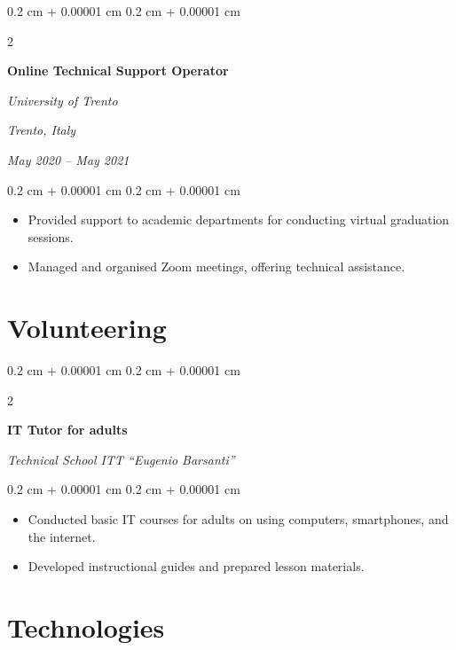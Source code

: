 \documentclass[10pt, a4paper]{article}
\newenvironment{highlights}{
    \begin{itemize}[
        topsep=0.10 cm,
        parsep=0.10 cm,
        partopsep=0pt,
        itemsep=0pt,
        leftmargin=0.4 cm + 10pt
    ]
}{
    \end{itemize}
} %
\newenvironment{onecolentry}{
    \begin{adjustwidth}{
        0.2 cm + 0.00001 cm
    }{
        0.2 cm + 0.00001 cm
    }
}{
    \end{adjustwidth}
} %
\newenvironment{twocolentry}[2][]{
    \onecolentry
    \def\secondColumn{#2}
    \setcolumnwidth{\fill, 6.5 cm}
    \begin{paracol}{2}
}{
    \switchcolumn \raggedleft \secondColumn
    \end{paracol}
    \endonecolentry
} %
\begin{document}
        \vspace{0.4 cm}

        \begin{twocolentry}{
        \textit{Trento, Italy}    
            
        \textit{May 2020 – May 2021}}
            \textbf{Online Technical Support Operator}
            
            \textit{University of Trento}
        \end{twocolentry}

        \vspace{0.10 cm}
        \begin{onecolentry}
            \begin{highlights}
                \item Provided support to academic departments for conducting virtual graduation sessions.
                \item Managed and organised Zoom meetings, offering technical assistance.
            \end{highlights}
        \end{onecolentry}



    
    \section{Volunteering}



        
        \begin{twocolentry}{
        \textit{Technical School ITT “Eugenio Barsanti”}    
            
        }
            \textbf{IT Tutor for adults}
        \end{twocolentry}

        \vspace{0.10 cm}
        \begin{onecolentry}
            \begin{highlights}
                \item Conducted basic IT courses for adults on using computers, smartphones, and the internet.
                \item Developed instructional guides and prepared lesson materials.
            \end{highlights}
        \end{onecolentry}



    
    \section{Technologies}
\end{document}
